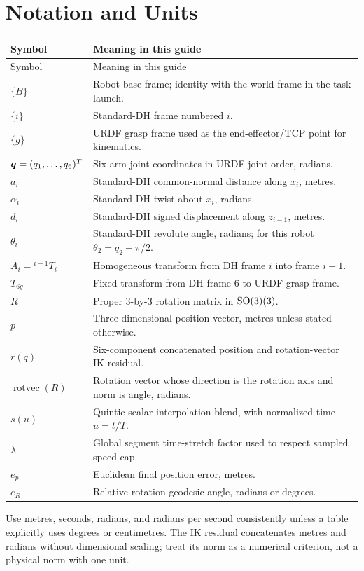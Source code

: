 \chapter{Notation and Units}
\label{app:notation}

\begin{longtable}{p{}p{}}
\toprule Symbol & Meaning in this guide\\\midrule\endfirsthead
\toprule Symbol & Meaning in this guide\\\midrule\endhead
$\{B\}$ & Robot base frame; identity with the world frame in the task launch.\\
$\{i\}$ & Standard-DH frame numbered $i$.\\
$\{g\}$ & URDF grasp frame used as the end-effector/TCP point for kinematics.\\
$\bm{q}=(q_1,\ldots,q_6)^T$ & Six arm joint coordinates in URDF joint order, radians.\\
$a_i$ & Standard-DH common-normal distance along $x_i$, metres.\\
$\alpha_i$ & Standard-DH twist about $x_i$, radians.\\
$d_i$ & Standard-DH signed displacement along $z_{i-1}$, metres.\\
$\theta_i$ & Standard-DH revolute angle, radians; for this robot $\theta_2=q_2-\pi/2$.\\
$A_i={} ^{i-1}T_i$ & Homogeneous transform from DH frame $i$ into frame $i-1$.\\
$T_{6g}$ & Fixed transform from DH frame 6 to URDF grasp frame.\\
$R$ & Proper 3-by-3 rotation matrix in $\mathrm{SO}(3)(3)$.\\
$p$ & Three-dimensional position vector, metres unless stated otherwise.\\
$r(q)$ & Six-component concatenated position and rotation-vector IK residual.\\
$\operatorname{rotvec}(R)$ & Rotation vector whose direction is the rotation axis and norm is angle, radians.\\
$s(u)$ & Quintic scalar interpolation blend, with normalized time $u=t/T$.\\
$\lambda$ & Global segment time-stretch factor used to respect sampled speed cap.\\
$e_p$ & Euclidean final position error, metres.\\
$e_R$ & Relative-rotation geodesic angle, radians or degrees.\\
\bottomrule
\end{longtable}

Use metres, seconds, radians, and radians per second consistently unless a
table explicitly uses degrees or centimetres. The IK residual concatenates
metres and radians without dimensional scaling; treat its norm as a numerical
criterion, not a physical norm with one unit.
